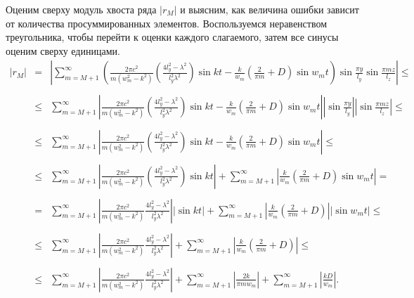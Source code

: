 Оценим сверху модуль хвоста ряда $|r_{M}|$ и выясним, как величина ошибки зависит от количества просуммированных элементов. Воспользуемся неравенством треугольника, чтобы перейти к оценки каждого слагаемого, затем все синусы оценим сверху единицами.
\begin{eqnarray*}
  |r_{M}| &=& \left| \sum \limits_{m=M+1}^{\infty} \left( \frac{2\pi c^2}{m(w_m^2 - k^2)}\left(\frac{4l_y^2 - \lambda^2}{l_y^2\lambda^2} \right)\sin{kt} - \frac{k}{w_m}\left(\frac{2}{\pi m} + D\right)\sin{w_mt} \right) \sin\frac{\pi y}{l_y} \sin\frac{\pi m z}{l_z} \right| \leq \\
  \\
  &\leq& \sum \limits_{m=M+1}^{\infty} \left| \frac{2\pi c^2}{m(w_m^2 - k^2)}\left(\frac{4l_y^2 - \lambda^2}{l_y^2\lambda^2} \right)\sin{kt} - \frac{k}{w_m}\left(\frac{2}{\pi m} + D\right)\sin{w_mt} \right| \left| \sin\frac{\pi y}{l_y} \right| \left| \sin\frac{\pi m z}{l_z} \right| \leq \\
  \\
  &\leq& \sum \limits_{m=M+1}^{\infty} \left| \frac{2\pi c^2}{m(w_m^2 - k^2)}\left(\frac{4l_y^2 - \lambda^2}{l_y^2\lambda^2} \right)\sin{kt} - \frac{k}{w_m}\left(\frac{2}{\pi m} + D\right)\sin{w_mt} \right| \leq \\
  \\
  &\leq& \sum \limits_{m=M+1}^{\infty} \left| \frac{2\pi c^2}{m(w_m^2 - k^2)}\left(\frac{4l_y^2 - \lambda^2}{l_y^2\lambda^2} \right)\sin{kt} \right| + \sum \limits_{m=M+1}^{\infty} \left| \frac{k}{w_m}\left(\frac{2}{\pi m} + D\right)\sin{w_mt} \right| = \\
  \\
  &=& \sum \limits_{m=M+1}^{\infty} \left| \frac{2\pi c^2}{m(w_m^2 - k^2)} \frac{4l_y^2 - \lambda^2}{l_y^2\lambda^2} \right| \left| \sin{kt} \right| + \sum \limits_{m=M+1}^{\infty} \left| \frac{k}{w_m}\left(\frac{2}{\pi m} + D\right) \right| \left| \sin{w_mt} \right| \leq \\
  \\
  &\leq& \sum \limits_{m=M+1}^{\infty} \left| \frac{2\pi c^2}{m(w_m^2 - k^2)} \frac{4l_y^2 - \lambda^2}{l_y^2\lambda^2} \right| + \sum \limits_{m=M+1}^{\infty} \left| \frac{k}{w_m}\left(\frac{2}{\pi m} + D\right) \right| \leq \\
  \\
  &\leq& \sum \limits_{m=M+1}^{\infty} \left| \frac{2\pi c^2}{m(w_m^2 - k^2)} \frac{4l_y^2 - \lambda^2}{l_y^2\lambda^2} \right| + \sum \limits_{m=M+1}^{\infty} \left| \frac{2 k}{\pi m w_m} \right| + \sum \limits_{m=M+1}^{\infty} \left| \frac{k D}{w_m} \right|.
\end{eqnarray*}

